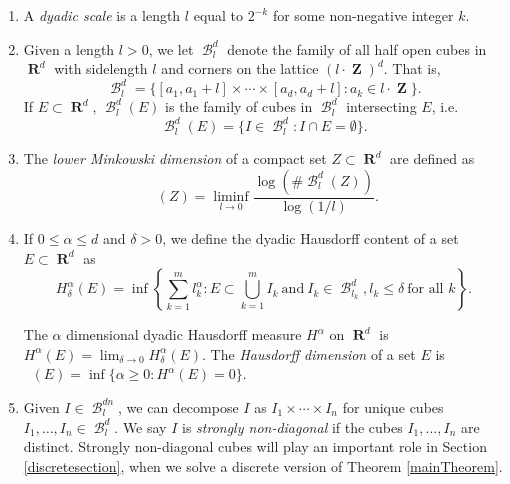 \documentclass[dvipsnames,letterpaper,12pt]{article}
\numberwithin{equation}{section}
\theoremstyle{plain}
\DeclareMathOperator{\hausdim}{\dim_{\mathbf{H}}}
\DeclareMathOperator{\lowminkdim}{\underline{\dim}_{\mathbf{M}}}
\DeclareMathOperator{\RR}{\mathbf{R}}
\DeclareMathOperator{\ZZ}{\mathbf{Z}}
\DeclareMathOperator{\B}{\mathcal{B}}
\begin{document}
\begin{enumerate}%
	\item A {\it dyadic scale} is a length $l$ equal to $2^{-k}$ for some non-negative integer $k$.

	\item Given a length $l > 0$, we let $\B^d_l$  denote the family of all half open cubes in $\RR^d$ with sidelength $l$ and corners on the lattice $(l \cdot \ZZ)^d$. That is,
	\[ \B^d_l = \{ [a_1, a_1 + l] \times \cdots \times [a_d, a_d+l] : a_k \in l \cdot \ZZ \}. \]
	If $E \subset \RR^d$, $\B^d_l(E)$ is the family of cubes in $\B^d_l$ intersecting $E$, i.e.
	\[ \B^d_l(E) = \{ I \in \B^d_l: I \cap E = \emptyset \}. \]

	\item The {\it lower Minkowski dimension} of a compact set $Z \subset \RR^d$ are defined as
	\begin{equation} \label{minkdimdef}
		\lowminkdim(Z) = \liminf_{l \to 0} \frac{\log(\# \B^d_l(Z))}{\log(1/l)}.
	\end{equation}

	\item If $0\leq\alpha\leq d$ and $\delta>0$, we define the dyadic Hausdorff content of a set $E\subset\RR^d$ as 
	\[ H^\alpha_\delta(E) = \inf \left\{ \sum_{k = 1}^m l_k^\alpha : E \subset \bigcup_{k = 1}^m I_k\ \text{and}\ I_k \in \B^d_{l_k}, l_k \leq \delta\ \text{for all $k$} \right\}. \]


	The $\alpha$ dimensional dyadic Hausdorff measure $H^\alpha$ on $\RR^d$ is $H^\alpha(E) = \lim_{\delta \to 0} H_\delta^\alpha(E)$. 
	The {\it Hausdorff dimension} of a set $E$ is $\hausdim(E) = \inf \{ \alpha \geq 0 : H^\alpha(E) = 0 \}$.


	\item \label{stronglyNonDiagonalDef}Given $I \in \B^{dn}_l$, we can decompose $I$ as $I_1 \times \cdots \times I_n$ for unique cubes $I_1, \dots, I_n \in \B_l^d$. We say $I$ is {\it strongly non-diagonal} if the cubes $I_1, \dots, I_n$ are distinct. Strongly non-diagonal cubes will play an important role in Section \ref{discretesection}, when we solve a discrete version of Theorem \ref{mainTheorem}. 


\end{enumerate}
\end{document}
